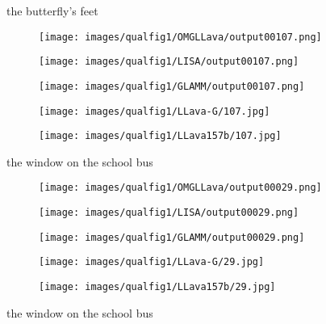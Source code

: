 \begin{figure*}[t]
\centering
the butterfly's feet 

\begin{subfigure}{0.19\textwidth}
\texttt{[image: images/qualfig1/OMGLLava/output00107.png]}
\end{subfigure}%
\begin{subfigure}{0.19\textwidth}
\texttt{[image: images/qualfig1/LISA/output00107.png]}
\end{subfigure}%
\begin{subfigure}{0.19\textwidth}
\texttt{[image: images/qualfig1/GLAMM/output00107.png]}
\end{subfigure}%
\begin{subfigure}{0.19\textwidth}
\texttt{[image: images/qualfig1/LLava-G/107.jpg]}
\end{subfigure}%
\begin{subfigure}{0.19\textwidth}
\texttt{[image: images/qualfig1/LLava157b/107.jpg]}
\end{subfigure}

the window on the school bus

\begin{subfigure}{0.19\textwidth}
\texttt{[image: images/qualfig1/OMGLLava/output00029.png]}
\end{subfigure}%
\begin{subfigure}{0.19\textwidth}
\texttt{[image: images/qualfig1/LISA/output00029.png]}
\end{subfigure}%
\begin{subfigure}{0.19\textwidth}
\texttt{[image: images/qualfig1/GLAMM/output00029.png]}
\end{subfigure}%
\begin{subfigure}{0.19\textwidth}
\texttt{[image: images/qualfig1/LLava-G/29.jpg]}
\end{subfigure}%
\begin{subfigure}{0.19\textwidth}
\texttt{[image: images/qualfig1/LLava157b/29.jpg]}
\end{subfigure}

the window on the school bus


\end{figure*}
